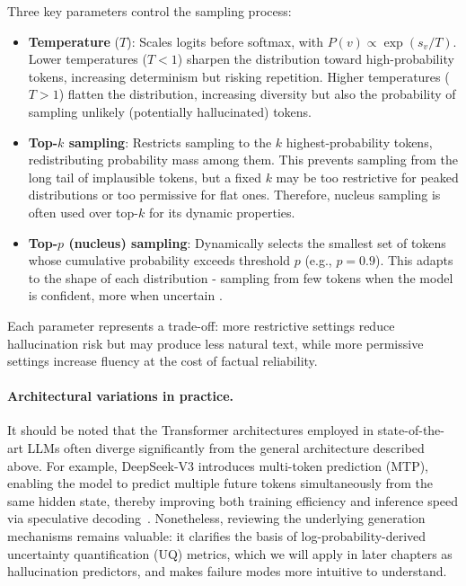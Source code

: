 Three key parameters control the sampling process:
\begin{itemize}[noitemsep]
    \item \textbf{Temperature} ($T$): Scales logits before softmax, with \(P(v) \propto \exp(s_v / T)\). Lower temperatures ($T < 1$) sharpen the distribution toward high-probability tokens, increasing determinism but risking repetition. Higher temperatures ($T > 1$) flatten the distribution, increasing diversity but also the probability of sampling unlikely (potentially hallucinated) tokens.
    \item \textbf{Top-$k$ sampling}: Restricts sampling to the $k$ highest-probability tokens, redistributing probability mass among them. This prevents sampling from the long tail of implausible tokens, but a fixed $k$ may be too restrictive for peaked distributions or too permissive for flat ones. Therefore, nucleus sampling is often used over top-$k$ for its dynamic properties.
    \item \textbf{Top-$p$ (nucleus) sampling}: Dynamically selects the smallest set of tokens whose cumulative probability exceeds threshold $p$ (e.g., $p=0.9$). This adapts to the shape of each distribution - sampling from few tokens when the model is confident, more when uncertain \citep{holtzman2020curiouscaseneuraltext}.
\end{itemize}
Each parameter represents a trade-off: more restrictive settings reduce hallucination risk but may produce less natural text, while more permissive settings increase fluency at the cost of factual reliability.

\paragraph{Architectural variations in practice.} It should be noted that the Transformer architectures employed in state-of-the-art LLMs often diverge significantly from the general architecture described above. For example, DeepSeek-V3 introduces multi-token prediction (MTP), enabling the model to predict multiple future tokens simultaneously from the same hidden state, thereby improving both training efficiency and inference speed via speculative decoding~\citep{deepseekv3}. Nonetheless, reviewing the underlying generation mechanisms remains valuable: it clarifies the basis of log-probability-derived uncertainty quantification (UQ) metrics, which we will apply in later chapters as hallucination predictors, and makes failure modes more intuitive to understand.

\FloatBarrier
